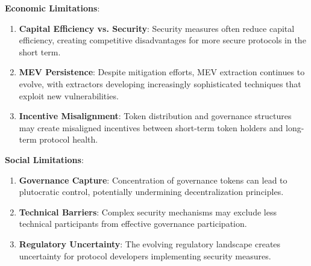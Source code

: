 \documentclass[conference]{IEEEtran}
\begin{document}
    \textbf{Economic Limitations}:
    \begin{enumerate}
        \item \textbf{Capital Efficiency vs. Security}: Security measures often reduce capital efficiency, creating competitive disadvantages for more secure protocols in the short term.
        
        \item \textbf{MEV Persistence}: Despite mitigation efforts, MEV extraction continues to evolve, with extractors developing increasingly sophisticated techniques that exploit new vulnerabilities.
        
        \item \textbf{Incentive Misalignment}: Token distribution and governance structures may create misaligned incentives between short-term token holders and long-term protocol health.
    \end{enumerate}

    \textbf{Social Limitations}:
    \begin{enumerate}
        \item \textbf{Governance Capture}: Concentration of governance tokens can lead to plutocratic control, potentially undermining decentralization principles.
        
        \item \textbf{Technical Barriers}: Complex security mechanisms may exclude less technical participants from effective governance participation.
        
        \item \textbf{Regulatory Uncertainty}: The evolving regulatory landscape creates uncertainty for protocol developers implementing security measures.
    \end{enumerate}
\end{document}
